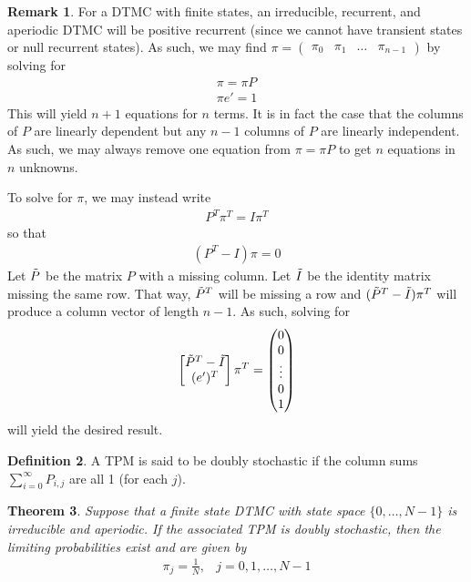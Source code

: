 \documentclass[11pt]{amsart}
\newtheorem{theorem}{Theorem}[section]
\theoremstyle{definition}
\newtheorem{definition}[theorem]{Definition}
\newtheorem{remark}[theorem]{Remark}
\numberwithin{equation}{section}
\begin{document}
 \begin{remark}
     For a DTMC with finite states, an irreducible, recurrent, and aperiodic DTMC will be positive recurrent (since we cannot have transient states or null recurrent states). As such, we may find $\pi=\begin{pmatrix}
         \pi_0 & \pi_1 &\ldots & \pi_{n-1}
     \end{pmatrix}$ by solving for 
     \begin{align*}
         \pi=\pi P\\
         \pi e'=1
     \end{align*}
     This will yield $n+1$ equations for $n$ terms. It is in fact the case that the columns of $P$ are linearly dependent but any $n-1$ columns of $P$ are linearly independent. As such, we may always remove one equation from $\pi=\pi P$ to get $n$ equations in $n$ unknowns.

     To solve for $\pi$, we may instead write
     \begin{align*}
         P^T\pi^T=I\pi^T
     \end{align*}
     so that
     \begin{align*}
         (P^T-I)\pi=0
     \end{align*}
     Let $\Tilde{P}$ be the matrix $P$ with a missing column. Let $\Tilde{I}$ be the identity matrix missing the same row. That way, $\Tilde{P}^T$ will be missing a row and $(\Tilde{P}^T-\Tilde{I})\pi^T$ will produce a column vector of length $n-1$. As such, solving for
     \begin{align*}
         \begin{bmatrix}
             \Tilde{P}^T-\Tilde{I}\\
             (e')^T
         \end{bmatrix}\pi^T=\begin{pmatrix}
             0\\
             0\\
             \vdots\\
             0\\
             1
         \end{pmatrix}
     \end{align*}
     will yield the desired result.
 \end{remark}
 \begin{definition}
     A TPM is said to be doubly stochastic if the column sums $\sum_{i=0}^\infty P_{i,j}$ are all 1 (for each $j$).
 \end{definition}
 \begin{theorem}
     Suppose that a finite state DTMC with state space $\{0,\ldots,N-1\}$ is irreducible and aperiodic. If the associated TPM is doubly stochastic, then the limiting probabilities exist and are given by
     \begin{align*}
         \pi_j=\frac{1}{N}, & j=0,1,\ldots,N-1
     \end{align*}
 \end{theorem}
\end{document}
